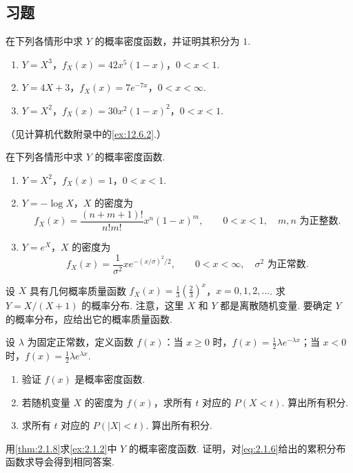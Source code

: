 \subsection{习题}\label{sec:2.5}
\setcounter{exercise}{0}
\begin{exercise}\label{exercise:2.1}
在下列各情形中求 $Y$ 的概率密度函数，并证明其积分为 $1$.
\begin{enumerate}
\item[(a)] $Y=X^3$，$f_X(x)=42x^5(1-x)$，$0<x<1$.
\item[(b)] $Y=4X+3$，$f_X(x)=7e^{-7x}$，$0<x<\infty$.
\item[(c)] $Y=X^2$，$f_X(x)=30x^2(1-x)^2$，$0<x<1$.
\end{enumerate}
（见计算机代数附录中的\autoref{ex:12.6.2}.）
\end{exercise}
\begin{exercise}\label{exercise:2.2}
在下列各情形中求 $Y$ 的概率密度函数.
\begin{enumerate}
\item[(a)] $Y=X^2$，$f_X(x)=1$，$0<x<1$.
\item[(b)] $Y=-\log X$，$X$ 的密度为
$$f_X(x)=\frac{(n+m+1)!}{n!m!}x^n(1-x)^m,\qquad0<x<1,\quad m,n\text{ 为正整数}.$$
\item[(c)] $Y=e^X$，$X$ 的密度为
$$f_X(x)=\frac1{\sigma^2}xe^{-(x/\sigma)^2/2},\qquad0<x<\infty,\quad\sigma^2\text{ 为正常数}.$$
\end{enumerate}
\end{exercise}
\begin{exercise}\label{exercise:2.3}
设 $X$ 具有几何概率质量函数 $f_X(x)=\frac13(\frac23)^x$，$x=0,1,2,\ldots$. 求 $Y=X/(X+1)$ 的概率分布. 注意，这里 $X$ 和 $Y$ 都是离散随机变量. 要确定 $Y$ 的概率分布，应给出它的概率质量函数.
\end{exercise}
\begin{exercise}\label{exercise:2.4}
设 $\lambda$ 为固定正常数，定义函数 $f(x)$：当 $x\ge0$ 时，$f(x)=\frac12\lambda e^{-\lambda x}$；当 $x<0$ 时，$f(x)=\frac12\lambda e^{\lambda x}$.
\begin{enumerate}
\item[(a)] 验证 $f(x)$ 是概率密度函数.
\item[(b)] 若随机变量 $X$ 的密度为 $f(x)$，求所有 $t$ 对应的 $P(X<t)$. 算出所有积分.
\item[(c)] 求所有 $t$ 对应的 $P(|X|<t)$. 算出所有积分.
\end{enumerate}
\end{exercise}
\begin{exercise}\label{exercise:2.5}
用\autoref{thm:2.1.8}求\autoref{ex:2.1.2}中 $Y$ 的概率密度函数. 证明，对\eqref{eq:2.1.6}给出的累积分布函数求导会得到相同答案.
\end{exercise}
